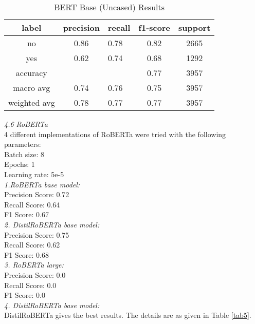 \documentclass[a4paper, 10pt, conference]{IEEEtran}
\begin{document}
{{{\begin{table}[h!]
\centering
  \caption{BERT Base (Uncased) Results}
  \label{tab4}
  \setlength{\tabcolsep}{6pt} %
  \renewcommand{\arraystretch}{1.2}%
    \begin{tabular}{c c l c c}
 \hline
    label & precision & recall & f1-score & support \\
    \hline
    no  & 0.86  &  0.78 &  0.82 & 2665 \\ %
    yes  & 0.62  &  0.74 &  0.68 & 1292 \\ %
    accuracy   &      &        &  0.77 & 3957 \\ %
    macro avg & 0.74 & 0.76 & 0.75 & 3957 \\ %
    weighted avg & 0.78 & 0.77 & 0.77 & 3957 \\ \hline
  \end{tabular}
\end{table}

\noindent\textit{4.6 RoBERTa}\\
4 different implementations of RoBERTa were tried with the following parameters:\\
Batch size: 8\\
Epochs: 1 \\
Learning rate: 5e-5\\

\noindent\textit{1.RoBERTa base model:}\\
Precision Score: 0.72\\
Recall Score: 0.64\\
F1 Score: 0.67\\

\noindent\textit{2. DistilRoBERTa base model:}\\
Precision Score: 0.75\\
Recall Score: 0.62\\
F1 Score: 0.68\\

\noindent\textit{3. RoBERTa large:}\\
Precision Score: 0.0\\
Recall Score: 0.0\\
F1 Score: 0.0\\

\noindent\textit{4. DistilRoBERTa base model:}\\

DistilRoBERTa gives the best results. The details are as given in Table \ref{tab5}. 

}}}
\end{document}
